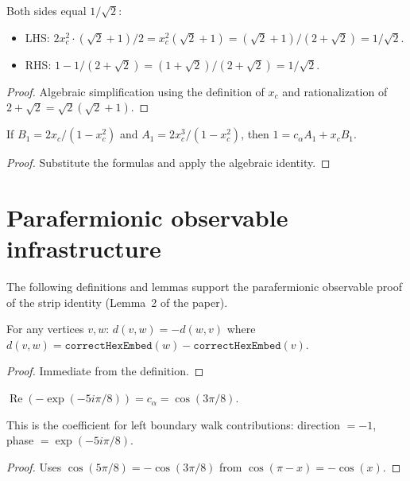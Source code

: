 \begin{lemma}
\begin{lemma}[Algebraic identity for $T=1$ strip]
  Both sides equal $1/\sqrt{2}$:
  \begin{itemize}
  \item LHS: $2x_c^2 \cdot (\sqrt{2}+1)/2 = x_c^2(\sqrt{2}+1)
    = (\sqrt{2}+1)/(2+\sqrt{2}) = 1/\sqrt{2}$.
  \item RHS: $1 - 1/(2+\sqrt{2}) = (1+\sqrt{2})/(2+\sqrt{2}) = 1/\sqrt{2}$.
  \end{itemize}
\end{lemma}
\begin{proof}
\leanok
  Algebraic simplification using the definition of $x_c$ and
  rationalization of $2+\sqrt{2} = \sqrt{2}(\sqrt{2}+1)$.
\end{proof}

\begin{lemma}[Strip identity for $T=1$ from formulas]\label{lem:strip_T1_from_formulas}
\leanok
{}
  If $B_1 = 2x_c/(1-x_c^2)$ and $A_1 = 2x_c^3/(1-x_c^2)$, then
  $1 = c_\alpha A_1 + x_c B_1$.
\end{lemma}
\begin{proof}
\leanok
  Substitute the formulas and apply the algebraic identity.
\end{proof}

\section{Parafermionic observable infrastructure}\label{sec:paraferm_infra}

The following definitions and lemmas support the parafermionic
observable proof of the strip identity (Lemma~2 of the paper).

\begin{lemma}\label{lem:edge_dir_antisymm}
\leanok
  For any vertices $v, w$: $d(v,w) = -d(w,v)$ where
  $d(v,w) = \texttt{correctHexEmbed}(w) - \texttt{correctHexEmbed}(v)$.
\end{lemma}
\begin{proof}
\leanok
  Immediate from the definition.
\end{proof}

\begin{lemma}\label{lem:left_bdy_re}
\leanok
  $\operatorname{Re}(-\exp(-5i\pi/8)) = c_\alpha = \cos(3\pi/8)$.

  This is the coefficient for left boundary walk contributions:
  direction $= -1$, phase $= \exp(-5i\pi/8)$.
\end{lemma}
\begin{proof}
\leanok
  Uses $\cos(5\pi/8) = -\cos(3\pi/8)$ from $\cos(\pi - x) = -\cos(x)$.
\end{proof}


\end{lemma}
